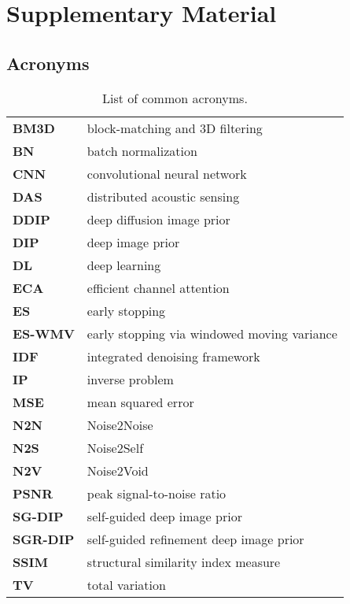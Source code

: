 \chapter{Supplementary Material}

\renewcommand\addcontentsline[3]{}  %

\section{Acronyms}

\begin{table}[h!]
    \centering
    \begin{tabular}{ l l }
        \toprule
        \textbf{BM3D} & block-matching and 3D filtering \\
        \textbf{BN} & batch normalization \\
        \textbf{CNN} & convolutional neural network \\
        \textbf{DAS} & distributed acoustic sensing \\
        \textbf{DDIP} & deep diffusion image prior \\
        \textbf{DIP} & deep image prior \\
        \textbf{DL} & deep learning \\
        \textbf{ECA} & efficient channel attention \\
        \textbf{ES} & early stopping \\
        \textbf{ES-WMV} & early stopping via windowed moving variance \\
        \textbf{IDF} & integrated denoising framework \\
        \textbf{IP} & inverse problem \\
        \textbf{MSE} & mean squared error \\
        \textbf{N2N} & Noise2Noise \\
        \textbf{N2S} & Noise2Self \\
        \textbf{N2V} & Noise2Void \\
        \textbf{PSNR} & peak signal-to-noise ratio \\
        \textbf{SG-DIP} & self-guided deep image prior \\
        \textbf{SGR-DIP} & self-guided refinement deep image prior \\
        \textbf{SSIM} & structural similarity index measure \\
        \textbf{TV} & total variation \\
        \bottomrule
    \end{tabular}
    \caption{List of common acronyms.}
\end{table}

